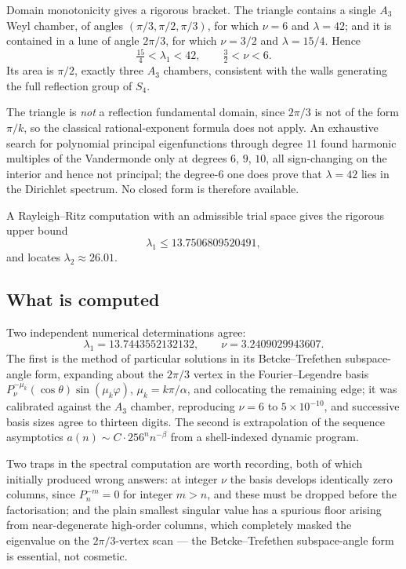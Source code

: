 \documentclass[11pt]{article}
\theoremstyle{definition}
\begin{document}
Domain monotonicity gives a rigorous bracket. The triangle contains a single
$A_3$ Weyl chamber, of angles $(\pi/3,\pi/2,\pi/3)$, for which $\nu=6$ and
$\lambda=42$; and it is contained in a lune of angle $2\pi/3$, for which
$\nu=3/2$ and $\lambda=15/4$. Hence
\[
  \tfrac{15}{4}<\lambda_1<42,\qquad \tfrac32<\nu<6 .
\]
Its area is $\pi/2$, exactly three $A_3$ chambers, consistent with the walls
generating the full reflection group of $S_4$.

The triangle is \emph{not} a reflection fundamental domain, since $2\pi/3$ is
not of the form $\pi/k$, so the classical rational-exponent formula does not
apply. An exhaustive search for polynomial principal eigenfunctions through
degree $11$ found harmonic multiples of the Vandermonde only at degrees $6$,
$9$, $10$, all sign-changing on the interior and hence not principal; the
degree-$6$ one does prove that $\lambda=42$ lies in the Dirichlet spectrum. No
closed form is therefore available.

A Rayleigh--Ritz computation with an admissible trial space gives the rigorous
upper bound
\[
  \lambda_1\le 13.7506809520491,
\]
and locates $\lambda_2\approx26.01$.

\subsection{What is computed}

Two independent numerical determinations agree:
\[
  \lambda_1=13.7443552132132,\qquad \nu=3.2409029943607 .
\]
The first is the method of particular solutions in its Betcke--Trefethen
subspace-angle form, expanding about the $2\pi/3$ vertex in the
Fourier--Legendre basis $P_\nu^{-\mu_k}(\cos\theta)\sin(\mu_k\varphi)$,
$\mu_k=k\pi/\alpha$, and collocating the remaining edge; it was calibrated
against the $A_3$ chamber, reproducing $\nu=6$ to $5\times10^{-10}$, and
successive basis sizes agree to thirteen digits. The second is extrapolation of
the sequence asymptotics $a(n)\sim C\cdot256^{n}n^{-\beta}$ from a
shell-indexed dynamic program.

Two traps in the spectral computation are worth recording, both of which
initially produced wrong answers: at integer $\nu$ the basis develops
identically zero columns, since $P_n^{-m}=0$ for integer $m>n$, and these must
be dropped before the factorisation; and the plain smallest singular value has
a spurious floor arising from near-degenerate high-order columns, which
completely masked the eigenvalue on the $2\pi/3$-vertex scan --- the
Betcke--Trefethen subspace-angle form is essential, not cosmetic.
\end{document}
